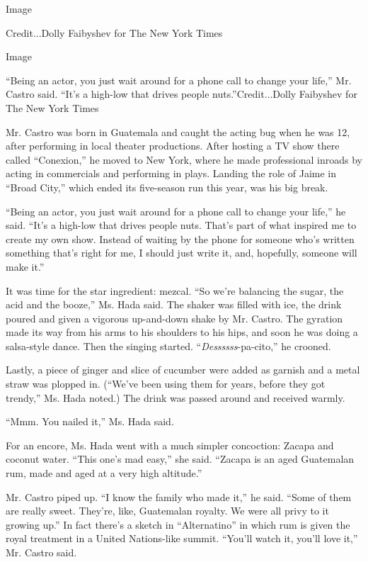 Image

Credit...Dolly Faibyshev for The New York Times

Image

``Being an actor, you just wait around for a phone call to change your
life,'' Mr. Castro said. ``It's a high-low that drives people
nuts.''Credit...Dolly Faibyshev for The New York Times

Mr. Castro was born in Guatemala and caught the acting bug when he was
12, after performing in local theater productions. After hosting a TV
show there called ``Conexion,'' he moved to New York, where he made
professional inroads by acting in commercials and performing in plays.
Landing the role of Jaime in ``Broad City,'' which ended its five-season
run this year, was his big break.

``Being an actor, you just wait around for a phone call to change your
life,'' he said. ``It's a high-low that drives people nuts. That's part
of what inspired me to create my own show. Instead of waiting by the
phone for someone who's written something that's right for me, I should
just write it, and, hopefully, someone will make it.''

It was time for the star ingredient: mezcal. ``So we're balancing the
sugar, the acid and the booze,'' Ms. Hada said. The shaker was filled
with ice, the drink poured and given a vigorous up-and-down shake by Mr.
Castro. The gyration made its way from his arms to his shoulders to his
hips, and soon he was doing a salsa-style dance. Then the singing
started. ``\emph{Dessssss}-pa-cito,'' he crooned.

Lastly, a piece of ginger and slice of cucumber were added as garnish
and a metal straw was plopped in. (``We've been using them for years,
before they got trendy,'' Ms. Hada noted.) The drink was passed around
and received warmly.

``Mmm. You nailed it,'' Ms. Hada said.

For an encore, Ms. Hada went with a much simpler concoction: Zacapa and
coconut water. ``This one's mad easy,'' she said. ``Zacapa is an aged
Guatemalan rum, made and aged at a very high altitude.''

Mr. Castro piped up. ``I know the family who made it,'' he said. ``Some
of them are really sweet. They're, like, Guatemalan royalty. We were all
privy to it growing up.'' In fact there's a sketch in ``Alternatino'' in
which rum is given the royal treatment in a United Nations-like summit.
``You'll watch it, you'll love it,'' Mr. Castro said.

